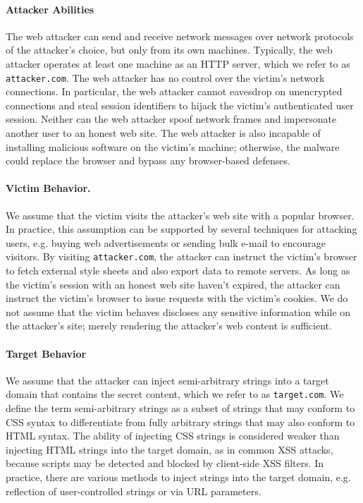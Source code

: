 \documentclass{acm_proc_article-sp}
\begin{document}
\paragraph{Attacker Abilities}
The web attacker can send and receive network messages over network protocols of the attacker's choice, but only from its own machines. Typically, the web attacker operates at least one machine as an HTTP server, which we refer to as \texttt{attacker.com}. The web attacker has no control over the victim's network connections. In particular, the web attacker cannot eavesdrop on unencrypted connections and steal session identifiers to hijack the victim's authenticated user session. Neither can the web attacker spoof network frames and impersonate another user to an honest web site.
The web attacker is also incapable of installing malicious software on the victim's machine; otherwise, the malware could replace the browser and bypass any browser-based defenses.

\paragraph{Victim Behavior.}
We assume that the victim visits the attacker's web site with a popular browser. In practice, this assumption can be supported by several techniques for attacking users, e.g. buying web advertisements or sending bulk e-mail to encourage visitors. By visiting \texttt{attacker.com}, the attacker can instruct the victim's browser to fetch external style sheets and also export data to remote servers. As long as the victim's session with an honest web site haven't expired, the attacker can instruct the victim's browser to issue requests with the victim's cookies.
We do not assume that the victim behaves discloses any sensitive information
while on the attacker's site; merely rendering the attacker's web content
is sufficient.

\paragraph{Target Behavior}
We assume that the attacker can inject semi-arbitrary strings into a target domain that contains the secret content, which we refer to as \texttt{target.com}. We define the term semi-arbitrary strings as a subset of strings that may conform to CSS syntax to differentiate from fully arbitrary strings that may also conform to HTML syntax. The ability of injecting CSS strings is considered weaker than injecting HTML strings into the target domain, as in common XSS attacks, because scripts may be detected and blocked by client-side XSS filters. In practice, there are various methods to inject strings into the target domain, e.g. reflection of user-controlled strings or via URL parameters.
\end{document}

